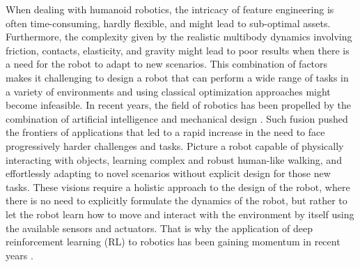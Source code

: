 When dealing with humanoid robotics, the intricacy of feature engineering  is often time-consuming, hardly flexible, and might lead to sub-optimal assets. Furthermore, the complexity given by the realistic multibody dynamics involving friction, contacts, elasticity, and gravity might lead to poor results when there is a need for the robot to adapt to new scenarios. This combination of factors makes it challenging to design a robot that can perform a wide range of tasks in a variety of environments and using classical optimization approaches might become infeasible. In recent years, the field of robotics has been propelled by the combination of artificial intelligence and mechanical design \citep{fadini_simulation_2022}.  Such fusion pushed the frontiers of applications that led to a rapid increase in the need to face progressively harder challenges and tasks.
Picture a robot capable of physically interacting with objects, learning complex and robust human-like walking, and effortlessly adapting to novel scenarios without explicit design for those new tasks. 
These visions require a holistic approach to the design of the robot, where there is no need to explicitly formulate the dynamics of the robot, but rather to let the robot learn how to move and interact with the environment by itself using the available sensors and actuators. That is why the application of deep reinforcement learning (\ac{RL}) to robotics has been gaining momentum in recent years \citep{golroudbari_recent_2023,li_reinforcement_2021}.

